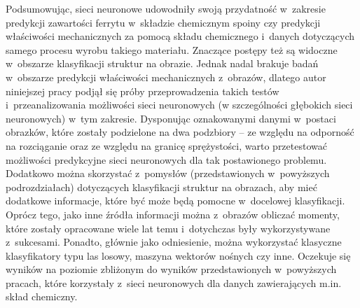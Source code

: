 Podsumowując, sieci neuronowe udowodniły swoją przydatność w~zakresie predykcji zawartości ferrytu w~składzie chemicznym spoiny czy predykcji właściwości mechanicznych za pomocą składu chemicznego i~danych dotyczących samego procesu wyrobu takiego materiału. Znaczące postępy też są widoczne w~obszarze klasyfikacji struktur na obrazie. Jednak nadal brakuje badań w~obszarze predykcji właściwości mechanicznych z~obrazów, dlatego autor niniejszej pracy podjął się próby przeprowadzenia takich testów i~przeanalizowania możliwości sieci neuronowych (w szczególności głębokich sieci neuronowych) w~tym zakresie. Dysponując oznakowanymi danymi w~postaci obrazków, które zostały podzielone na dwa podzbiory –  ze względu na odporność na rozciąganie oraz ze względu na granicę sprężystości, warto przetestować możliwości predykcyjne sieci neuronowych dla tak postawionego problemu. Dodatkowo można skorzystać z~pomysłów (przedstawionych w~powyższych podrozdziałach) dotyczących klasyfikacji struktur na obrazach, aby mieć dodatkowe informacje, które być może będą pomocne w~docelowej klasyfikacji. Oprócz tego, jako inne źródła informacji można z~obrazów obliczać momenty, które zostały opracowane wiele lat temu i~dotychczas były wykorzystywane z~sukcesami. Ponadto, głównie jako odniesienie, można wykorzystać klasyczne klasyfikatory typu las losowy, maszyna wektorów nośnych czy inne. Oczekuje się wyników na poziomie zbliżonym do wyników przedstawionych w~powyższych pracach, które korzystały z~sieci neuronowych dla danych zawierających m.in. skład chemiczny.  








